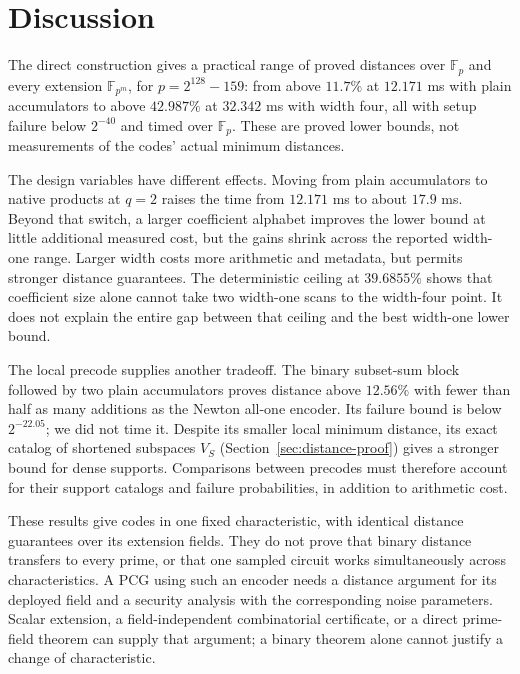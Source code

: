 \documentclass[runningheads,envcountsame,envcountsect]{llncs}
\newcommand{\F}{\mathbb F}
\begin{document}



\section{Discussion}\label{sec:discussion}

The direct construction gives a practical range of proved distances over
$\F_p$ and every extension $\F_{p^m}$, for $p=2^{128}-159$: from above
$11.7\%$ at $12.171$ ms with plain accumulators to above $42.987\%$ at
$32.342$ ms with width four, all with setup failure below $2^{-40}$ and
timed over $\F_p$. These are proved lower bounds, not measurements of
the codes' actual minimum distances.

The design variables have different effects. Moving from plain
accumulators to native products at $q=2$ raises the time from
$12.171$ ms to about $17.9$ ms. Beyond that switch, a larger coefficient
alphabet improves the lower bound at little additional measured cost,
but the gains shrink across the reported width-one range. Larger width
costs more arithmetic and metadata,
but permits stronger distance guarantees. The deterministic ceiling at
$39.6855\%$ shows that coefficient size alone cannot take two width-one
scans to the width-four point. It does not explain the entire gap
between that ceiling and the best width-one lower bound.

The local precode supplies another tradeoff. The binary subset-sum block
followed by two plain accumulators proves distance above $12.56\%$ with
fewer than half as many additions as the Newton all-one encoder.
Its failure bound is below $2^{-22.05}$; we did not time it. Despite its
smaller local minimum distance, its exact catalog of shortened subspaces
$V_S$ (Section~\ref{sec:distance-proof}) gives a stronger bound for dense
supports.
Comparisons between precodes must therefore account for their support
catalogs and failure probabilities, in addition to arithmetic cost.

These results give codes in one fixed characteristic, with identical
distance guarantees over its extension fields. They do not
prove that binary distance transfers to every prime, or that one sampled
circuit works simultaneously across characteristics. A PCG using such
an encoder needs a distance argument for its deployed field and a
security analysis with the corresponding noise parameters. Scalar
extension, a field-independent combinatorial certificate, or a direct
prime-field theorem can supply that argument; a binary theorem alone
cannot justify a change of characteristic.
\end{document}
